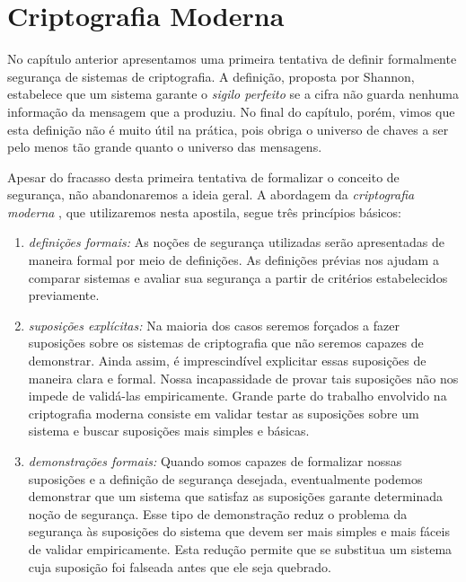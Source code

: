 \chapter{Criptografia Moderna}
\label{cha:criptografia-moderna}

No capítulo anterior apresentamos uma primeira tentativa de definir formalmente segurança de sistemas de criptografia.
A definição, proposta por Shannon, estabelece que um sistema garante o {\em sigilo perfeito} se a cifra não guarda nenhuma informação da mensagem que a produziu.
No final do capítulo, porém, vimos que esta definição não é muito útil na prática, pois obriga o universo de chaves a ser pelo menos tão grande quanto o universo das mensagens.

Apesar do fracasso desta primeira tentativa de formalizar o conceito de segurança, não abandonaremos a ideia geral.
A abordagem da {\em criptografia moderna} \cite{Goldwasser84}, que utilizaremos nesta apostila, segue três princípios básicos:
\begin{enumerate}
\item {\em definições formais:} As noções de segurança utilizadas serão apresentadas de maneira formal por meio de definições. 
As definições prévias nos ajudam a comparar sistemas e avaliar sua segurança a partir de critérios estabelecidos previamente.
\item {\em suposições explícitas:} Na maioria dos casos seremos forçados a fazer suposições sobre os sistemas de criptografia que não seremos capazes de demonstrar.
Ainda assim, é imprescindível explicitar essas suposições de maneira clara e formal.
Nossa incapassidade de provar tais suposições não nos impede de validá-las empiricamente.
Grande parte do trabalho envolvido na criptografia moderna consiste em validar testar as suposições sobre um sistema e buscar suposições mais simples e básicas.
\item {\em demonstrações formais:} Quando somos capazes de formalizar nossas suposições e a definição de segurança desejada, eventualmente podemos demonstrar que um sistema que satisfaz as suposições garante determinada noção de segurança.
Esse tipo de demonstração reduz o problema da segurança às suposições do sistema que devem ser mais simples e mais fáceis de validar empiricamente.
Esta redução permite que se substitua um sistema cuja suposição foi falseada antes que ele seja quebrado.
\end{enumerate}


